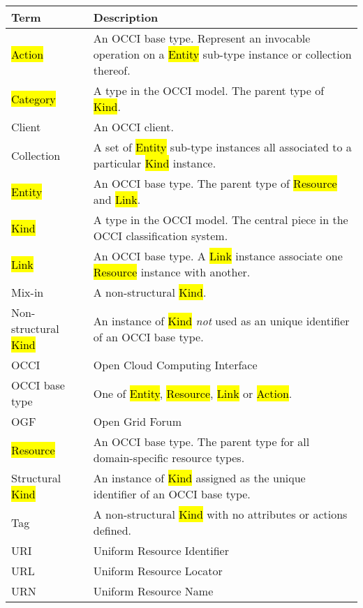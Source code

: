 \begin{tabular}{l|p{11cm}}
Term & Description \\
\hline
\hl{Action} & An OCCI base type. Represent an invocable operation on a \hl{Entity} sub-type instance or collection thereof. \\
\hl{Category} & A type in the OCCI model. The parent type of \hl{Kind}. \\
Client & An OCCI client.\\
Collection & A set of \hl{Entity} sub-type instances all associated to a particular \hl{Kind} instance. \\
\hl{Entity} & An OCCI base type. The parent type of \hl{Resource} and \hl{Link}. \\
\hl{Kind} & A type in the OCCI model. The central piece in the OCCI classification system. \\
\hl{Link} & An OCCI base type. A \hl{Link} instance associate one \hl{Resource} instance with another. \\
Mix-in & A non-structural \hl{Kind}. \\
Non-structural \hl{Kind} & An instance of \hl{Kind} {\em not} used as an unique identifier of an OCCI base type. \\
OCCI & Open Cloud Computing Interface \\
OCCI base type & One of \hl{Entity}, \hl{Resource}, \hl{Link} or \hl{Action}. \\
OGF & Open Grid Forum \\
\hl{Resource} & An OCCI base type. The parent type for all domain-specific resource types. \\
Structural \hl{Kind} & An instance of \hl{Kind} assigned as the unique identifier of an OCCI base type. \\
Tag & A non-structural \hl{Kind} with no attributes or actions defined. \\
URI & Uniform Resource Identifier \\
URL & Uniform Resource Locator \\
URN & Uniform Resource Name \\
\end{tabular}
